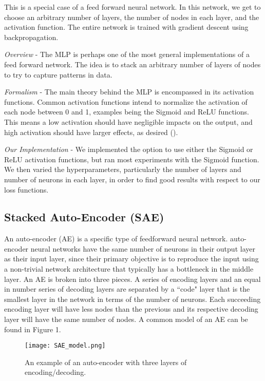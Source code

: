 \documentclass[twoside,11pt]{article}
\begin{document}
This is a special case of a feed forward neural network. In this network, we get to choose an arbitrary number of layers, the number of nodes in each layer, and the activation function. The entire network is trained with gradient descent using backpropagation.

\textit{Overview} - The MLP is perhaps one of the most general implementations of a feed forward network. The idea is to stack an arbitrary number of layers of nodes to try to capture patterns in data.

\textit{Formalism} - The main theory behind the MLP is encompassed in its activation functions. Common activation functions intend to normalize the activation of each node between 0 and 1, examples being the Sigmoid and ReLU functions. This means a low activation should have negligible impacts on the output, and high activation should have larger effects, as desired (\cite{MLPStuff}).

\textit{Our Implementation} - We implemented the option to use either the Sigmoid or ReLU activation functions, but ran most experiments with the Sigmoid function. We then varied the hyperparameters, particularly the number of layers and number of neurons in each layer, in order to find good results with respect to our loss functions.

\subsection{Stacked Auto-Encoder (SAE)}

An auto-encoder (AE) is a specific type of feedforward neural network. auto-encoder neural networks have the same number of neurons in their output layer as their input layer, since their primary objective is to reproduce the input using a non-trivial network architecture that typically has a bottleneck in the middle layer. An AE is broken into three pieces. A series of encoding layers and an equal in number series of decoding layers are separated by a ``code" layer that is the smallest layer in the network in terms of the number of neurons. Each succeeding encoding layer will have less nodes than the previous and its respective decoding layer will have the same number of nodes. A common model of an AE can be found in Figure 1.

\begin{figure}
    \centering
    \texttt{[image: SAE\_model.png]}
    \caption{An example of an auto-encoder with three layers of encoding/decoding.}
    \label{fig:my_label}
\end{figure}
\end{document}
